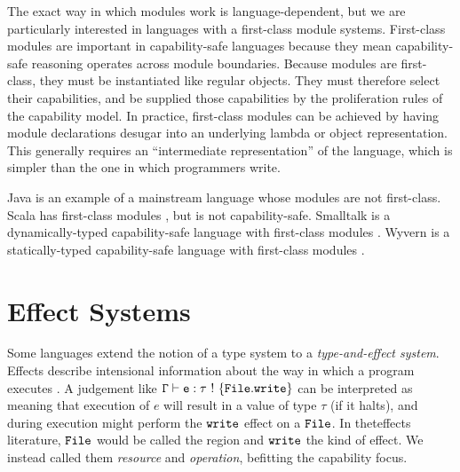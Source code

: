 The exact way in which modules work is language-dependent, but we are particularly interested in languages with a first-class module systems. First-class modules are important in capability-safe languages because they mean capability-safe reasoning operates across module boundaries. Because modules are first-class, they must be instantiated like regular objects. They must therefore select their capabilities, and be supplied those capabilities by the proliferation rules of the capability model. In practice, first-class modules can be achieved by having module declarations desugar into an underlying lambda or object representation. This generally requires an ``intermediate representation'' of the language, which is simpler than the one in which programmers write.

Java is an example of a mainstream language whose modules are not first-class. Scala has first-class modules \cite{odersky16}, but is not capability-safe. Smalltalk is a dynamically-typed capability-safe language with first-class modules \cite{bracha10}. Wyvern is a statically-typed capability-safe language with first-class modules \cite{kurilova16}.

\section{Effect Systems}

Some languages extend the notion of a type system to a \textit{type-and-effect system}. Effects describe intensional information about the way in which a program executes \cite{nielson99}. A judgement like $\mathtt{\Gamma \vdash e: \tau~!~\{ File.write \}}$ can be interpreted as meaning that execution of $e$ will result in a value of type $\tau$ (if it halts), and during execution might perform the $\mathtt{write}$ effect on a $\mathtt{File}$. In theteffects literature, $\mathtt{File}$ would be called the region and $\mathtt{write}$ the kind of effect. We instead called them \textit{resource} and \textit{operation}, befitting the capability focus.
